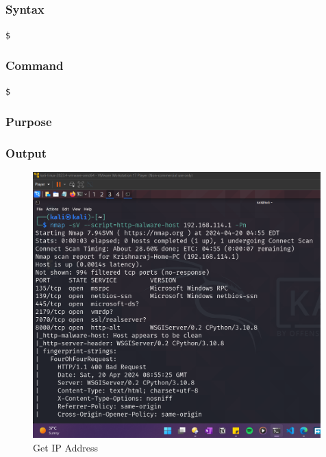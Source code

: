 \documentclass[11pt]{article}
\begin{document}
\subsection{}

\subsubsection*{Syntax}
\begin{verbatim}
$
\end{verbatim}

\subsubsection*{Command}
\begin{verbatim}
$
\end{verbatim}

\subsubsection*{Purpose}

\subsubsection*{Output}
\begin{figure}[H]
    \centering
    \includegraphics[width=0.99\textwidth]{a3_ss (8).png}
    \caption{Get IP Address}
    \label{fig:1}
\end{figure}
\end{document}

